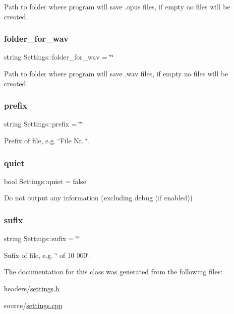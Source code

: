Path to folder where program will save .opus files, if empty no files will be created. 

\mbox{\label{class_settings_aef224f0e1626351f15eaf48609c4366c}} 
\subsubsection{\texorpdfstring{folder\+\_\+for\+\_\+wav}{folder\_for\_wav}}
{\footnotesize\ttfamily string Settings\+::folder\+\_\+for\+\_\+wav = \char`\"{}\char`\"{}}



Path to folder where program will save .wav files, if empty no files will be created. 

\mbox{\label{class_settings_aef15e87bccc305b810277337fa853ab9}} 
\subsubsection{\texorpdfstring{prefix}{prefix}}
{\footnotesize\ttfamily string Settings\+::prefix = \char`\"{}\char`\"{}}



Prefix of file, e.\+g. \char`\"{}\+File Nr. \char`\"{}. 

\mbox{\label{class_settings_a1c533c67c68ec619c34adbf2ae70bfb6}} 
\subsubsection{\texorpdfstring{quiet}{quiet}}
{\footnotesize\ttfamily bool Settings\+::quiet = false}



Do not output any information (excluding debug (if enabled)) 

\mbox{\label{class_settings_a784e2b16e9280cc9250b3c4306573b16}} 
\subsubsection{\texorpdfstring{sufix}{sufix}}
{\footnotesize\ttfamily string Settings\+::sufix = \char`\"{}\char`\"{}}



Sufix of file, e.\+g. \char`\"{} of 10 000\char`\"{}. 



The documentation for this class was generated from the following files\+:\begin{DoxyCompactItemize}
\item 
headers/\hyperlink{settings_8h}{settings.\+h}\item 
source/\hyperlink{settings_8cpp}{settings.\+cpp}\end{DoxyCompactItemize}
